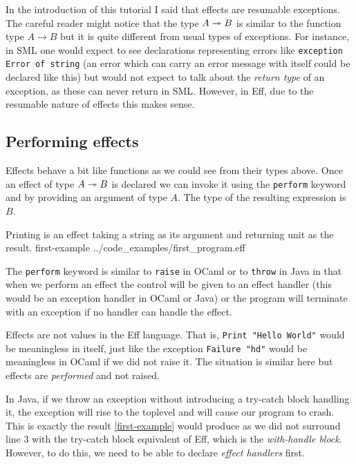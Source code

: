 \documentclass[class=article, crop=false]{standalone}
\begin{document}
In the introduction of this tutorial I said that effects are resumable
exceptions. The careful reader might notice that the type $A \twoheadrightarrow B$ is similar
to the function type $A \to B$ but it is quite different from usual types of
exceptions. For instance, in SML \cite{milner1997definition} one would expect
to see declarations representing errors like
\lstinline{exception Error of string} (an error which can carry an error message
with itself could be declared like this) but would not expect to talk about the
\emph{return type} of an exception, as these can never return in SML. However,
in Eff, due to the resumable nature of effects this makes sense.

\subsection{Performing effects}

Effects behave a bit like functions as we could see from their types above.
Once an effect of type $A \twoheadrightarrow B$ is declared we can invoke it
using the \lstinline{perform} keyword and by providing an argument of type $A$.
The type of the resulting expression is $B$.

{Printing is an effect taking a string as its argument and returning unit as the result.}
{first-example}
{../code_examples/first_program.eff}

The \lstinline{perform} keyword is similar to \lstinline|raise| in OCaml or to
\lstinline|throw| in Java in that when we perform an effect the control will be
given to an effect handler (this would be an exception handler in OCaml or Java)
or the program will terminate with an exception if no handler can handle the
effect.

Effects are not values in the Eff language. That is,
\lstinline{Print "Hello World"} would be meaningless
in itself, just like the exception \lstinline{Failure "hd"} would be meaningless
in OCaml if we did not raise it. The situation is similar here but effects are
\emph{performed} and not raised.

In Java, if we throw an exception without introducing a try-catch block handling
it, the exception will rise to the toplevel and will cause our program to crash.
This is exactly the result \autoref{first-example} would produce as we did not
surround line 3 with the try-catch block equivalent of Eff, which is the
\emph{with-handle block}. However, to do this, we need to be able to declare
\emph{effect handlers} first.
\end{document}
